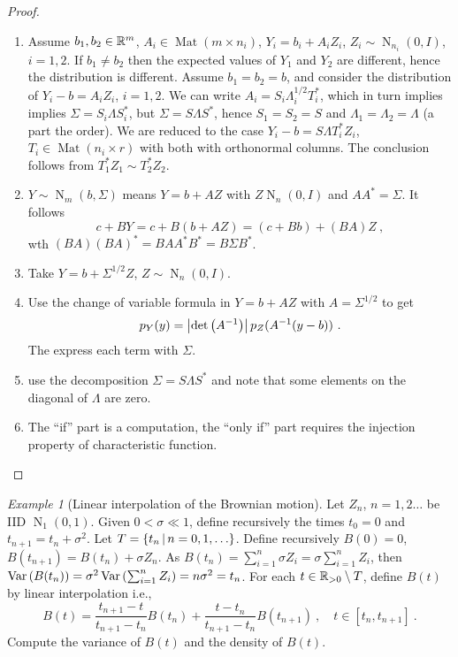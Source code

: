 \documentclass[12pt,a4paper]{amsart}
\newcommand{\MRof}[2]{\operatorname{Mat}\left(#1\times#2\right)}
\newcommand{\gaussian}[3]{\operatorname{N}_{#1}\left(#2,#3\right)}
\theoremstyle{plain}%
\theoremstyle{definition}
\theoremstyle{remark}
\newtheorem{example}{Example}
\begin{document}
\begin{proof}\ 
  \begin{enumerate}
  \item Assume $b_1,b_2 \in \mathbb{R}^m$, $A_i \in \MRof m {n_i}$, $Y_i = b_i + A_i Z_i$, $Z_i \sim \gaussian {n_i} 0 I$, $i = 1,2$. If $b_1 \ne b_2$ then the expected values of $Y_1$ and $Y_2$ are different, hence the distribution is different. Assume $b_1 = b_2 = b$, and consider the distribution of $Y_i - b = A_iZ_i$, $i=1,2$. We can write $A_i = S_i\Lambda_i^{1/2}T_i^*$, which in turn implies implies $\Sigma = S_i \Lambda S_i^*$, but $\Sigma = S\Lambda S^*$, hence $S_1=S_2=S$ and $\Lambda_1=\Lambda_2=\Lambda$ (a part the order). We are reduced to the case $Y_i - b = S\Lambda T_i^* Z_i$, $T_i \in \MRof {n_i} r$ with both with orthonormal columns. The conclusion follows from $T_1^* Z_1 \sim T_2^*Z_2$.
    \item $Y \sim \gaussian m b \Sigma$ means $Y = b + AZ$ with $Z \gaussian n 0 I$ and $AA^* = \Sigma$. It follows
      \begin{equation*}
 c + BY = c + B(b+AZ) = (c+Bb) + (BA) Z \ ,       
      \end{equation*}
wth $(BA)(BA)^* = B AA^*B^* = B \Sigma B^*$.
  \item Take $Y = b + \Sigma^{1/2}Z$, $Z \sim \gaussian n 0 I$.
\item Use the change of variable formula in $Y = b + AZ$ with $A = \Sigma^{1/2}$ to get
  \begin{equation*}
    p_Y(y) = \left\vert\operatorname{det}\left(A^{-1}\right)\right\vert p_Z(A^{-1}(y-b)) \ . 
  \end{equation*}
The express each term with $\Sigma$.
  \item use the decomposition $\Sigma = S \Lambda S^*$ and note that some elements on the diagonal of $\Lambda$ are zero.
  \item The ``if'' part is a computation, the ``only if'' part requires the injection property of characteristic function.
  \end{enumerate}
\end{proof}

\begin{example}[Linear interpolation of the Brownian motion] Let $Z_n$, $n=1,2\dots$ be IID $\gaussian 1 0 1$. Given $0 < \sigma \ll 1$, define recursively the times $t_0=0$ and $t_{n+1} = t_n + \sigma^2$. Let $T = \setof{t_n}{n = 0,1,\dots}$. Define recursively $B(0)=0$, $B(t_{n+1}) = B(t_n) + \sigma Z_n$. As $B(t_n) = \sum_{i=1}^n \sigma Z_i = \sigma \sum_{i=1}^n Z_i$, then $\operatorname{Var}\left(B(t_n)\right) = \sigma^2 \operatorname{Var}\left(\sum_{i=1}^n Z_i\right) = n\sigma^2 = t_n$. For each $t \in \mathbb{R}_{>0} \setminus T$, define $B(t)$ by linear interpolation i.e., 
  \begin{equation*}
B(t) = \frac{t_{n+1}-t}{t_{n+1}-t_n}B(t_n) + \frac{t - t_{n}}{t_{n+1}-t_n}B(t_{n+1}) \ , \quad t \in [t_n,t_{n+1}] \ .     
  \end{equation*}
Compute the variance of $B(t)$ and the density of $B(t)$. 
  
\end{example}
\end{document}

